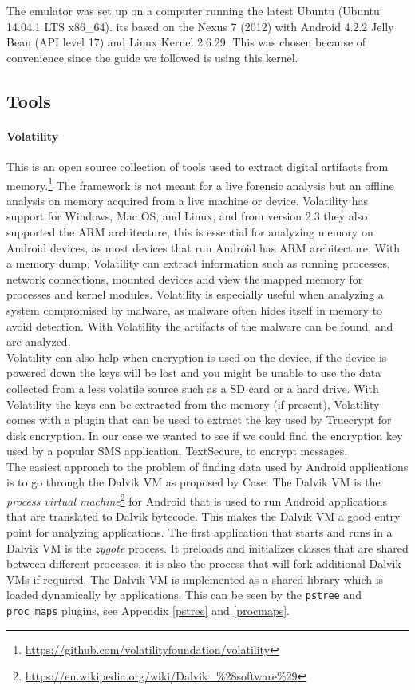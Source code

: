 The emulator was set up on a computer running the latest Ubuntu (Ubuntu 14.04.1 LTS x86\_64).
its based on the Nexus 7 (2012) with Android 4.2.2 Jelly Bean 
(API level 17) and Linux Kernel 2.6.29. This was chosen because of convenience
since the guide we followed is using this kernel.
\subsection{Tools}
\paragraph{Volatility} This is an open source collection of tools used to extract digital
  artifacts from memory.\footnote{\url{https://github.com/volatilityfoundation/volatility}} 
  The framework is not meant for a live forensic analysis but an offline analysis
  on memory acquired from a live machine or device. Volatility has support for Windows, Mac OS, and Linux, and
  from version 2.3 they also supported the ARM architecture, this is essential
  for analyzing memory on Android devices, as most devices that run Android has
  ARM architecture. With a memory dump, Volatility can extract information such as
  running processes, network connections, mounted devices and view the mapped
  memory for processes and kernel modules. Volatility is especially useful when
  analyzing a system compromised by malware, as malware often hides itself in
  memory to avoid detection. With Volatility the artifacts of the malware can be
  found, and are analyzed. \\
  
  Volatility can also help when encryption is used on the device, if the device is
  powered down the keys will be lost and you might be unable to use the data 
  collected from a less volatile source such as a SD card or a hard drive. With
  Volatility the keys can be extracted from the memory (if present), Volatility 
  comes with a plugin that can be used to extract the key used by Truecrypt for 
  disk encryption. In our case we wanted to see if we could find the encryption
  key used by a popular SMS application, TextSecure, to encrypt messages.\\
  
  The easiest approach to the problem of finding data used by Android
  applications is to go through the Dalvik VM as proposed by Case\cite{case2011}.
  The Dalvik VM is the \textit{process virtual
  machine}\footnote{\url{https://en.wikipedia.org/wiki/Dalvik\_\%28software\%29}} for
  Android that is used to run Android applications that are translated to
  Dalvik bytecode. This makes the Dalvik VM a good entry point for analyzing
  applications. The first application that starts and runs in a Dalvik VM is the
  \textit{zygote} process. It preloads and initializes classes that are shared
  between different processes, it is also the process that will fork additional
  Dalvik VMs if required. The Dalvik VM is implemented as a shared library which
  is loaded dynamically by applications. This can be seen by the \texttt{pstree} and
  \texttt{proc\_maps} plugins, see Appendix \ref{pstree} and \ref{procmaps}. \\

